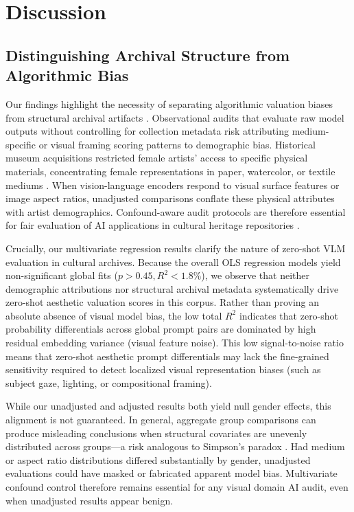 \documentclass[pdflatex,sn-mathphys-num]{sn-jnl}%
\theoremstyle{thmstyleone}%
\theoremstyle{thmstyletwo}%
\theoremstyle{thmstylethree}%
\begin{document}
\section{Discussion}
\label{sec:discussion}

\subsection{Distinguishing Archival Structure from Algorithmic Bias}
Our findings highlight the necessity of separating algorithmic valuation biases from structural archival artifacts \cite{hall2023auditing, noorthuis2020bias, simpson1951interpretation}. Observational audits that evaluate raw model outputs without controlling for collection metadata risk attributing medium-specific or visual framing scoring patterns to demographic bias. Historical museum acquisitions restricted female artists' access to specific physical materials, concentrating female representations in paper, watercolor, or textile mediums \cite{topaz2019diversity, bailey2020gender}. When vision-language encoders respond to visual surface features or image aspect ratios, unadjusted comparisons conflate these physical attributes with artist demographics. Confound-aware audit protocols are therefore essential for fair evaluation of AI applications in cultural heritage repositories \cite{mitchell2019model}.

Crucially, our multivariate regression results clarify the nature of zero-shot VLM evaluation in cultural archives. Because the overall OLS regression models yield non-significant global fits ($p > 0.45, R^2 < 1.8\%$), we observe that neither demographic attributions nor structural archival metadata systematically drive zero-shot aesthetic valuation scores in this corpus. Rather than proving an absolute absence of visual model bias, the low total $R^2$ indicates that zero-shot probability differentials across global prompt pairs are dominated by high residual embedding variance (visual feature noise). This low signal-to-noise ratio means that zero-shot aesthetic prompt differentials may lack the fine-grained sensitivity required to detect localized visual representation biases (such as subject gaze, lighting, or compositional framing).

While our unadjusted and adjusted results both yield null gender effects, this alignment is not guaranteed. In general, aggregate group comparisons can produce misleading conclusions when structural covariates are unevenly distributed across groups---a risk analogous to Simpson's paradox \cite{simpson1951interpretation}. Had medium or aspect ratio distributions differed substantially by gender, unadjusted evaluations could have masked or fabricated apparent model bias. Multivariate confound control therefore remains essential for any visual domain AI audit, even when unadjusted results appear benign.
\end{document}
